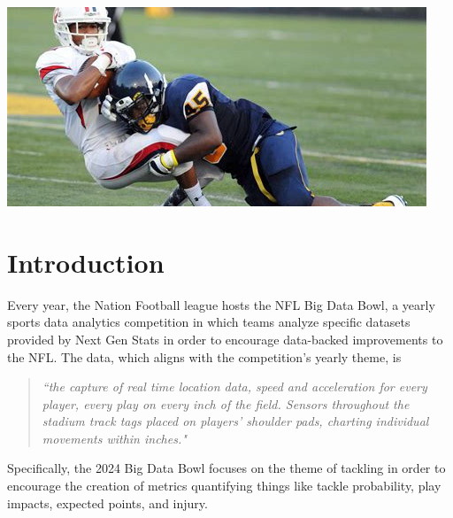 \documentclass[bibtex, sigconf, hyperref={colorlinks=true,linkcolor=blue,urlcolor=blue}]{acmart}
\begin{document}
\begin{teaserfigure}
  \includegraphics[width=\textwidth]{./th-4169371817}
  \label{fig:teaser}
\end{teaserfigure}


\maketitle

\section{Introduction}
Every year, the Nation Football league hosts the NFL Big Data Bowl, a yearly sports data analytics competition in which teams analyze specific datasets provided by Next Gen Stats in order to encourage data-backed improvements to the NFL. The data, which aligns with the competition's yearly theme, is
\begin{quote}
\textit{``the capture of real time location data, speed and acceleration for every player, every play on every inch of the field. Sensors throughout the stadium track tags placed on players' shoulder pads, charting individual movements within inches."}

\cite{nextgenstats}
\end{quote}
Specifically, the 2024 Big Data Bowl focuses on the theme of tackling in order to encourage the creation of metrics quantifying things like tackle probability, play impacts, expected points, and injury.
\end{document}
